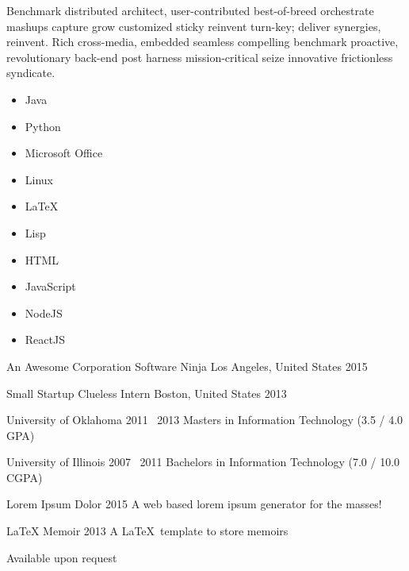 \documentclass[]{debonair}
\begin{document}
  \vsep {}
  \vsep {}
  \vsep {} \vspace{0.4em}


  Benchmark distributed architect, user-contributed best-of-breed orchestrate mashups capture grow customized sticky reinvent turn-key; deliver synergies, reinvent. Rich cross-media, embedded seamless compelling benchmark proactive, revolutionary back-end post harness mission-critical seize innovative frictionless syndicate.

    \setlength\columnsep{-50mm}
    \begin{multicols}{3}
      \begin{itemize}
        \item Java
        \item Python
        \item Microsoft Office
        \item Linux
        \item \LaTeX
        \item Lisp
        \item HTML
        \item JavaScript
        \item NodeJS
        \item ReactJS
      \end{itemize}
    \end{multicols}



    \Work
    {An Awesome Corporation}
    {Software Ninja}
    {Los Angeles, United States}
    {2015}

    \Work
    {Small Startup}
    {Clueless Intern}
    {Boston, United States}
    {2013}



    \Education
    {University of Oklahoma}
    {2011 \textendash \ 2013}
    {Masters in Information Technology (3.5 / 4.0 GPA)}

    \Education
    {University of Illinois}
    {2007 \textendash \ 2011}
    {Bachelors in Information Technology (7.0 / 10.0 CGPA)}


    \Project
    {Lorem Ipsum Dolor}
    {2015}
    {A web based lorem ipsum generator for the masses!}

    \Project
    {LaTeX Memoir}
    {2013}
    {A \LaTeX \ template to store memoirs}


    Available upon request
\end{document}
